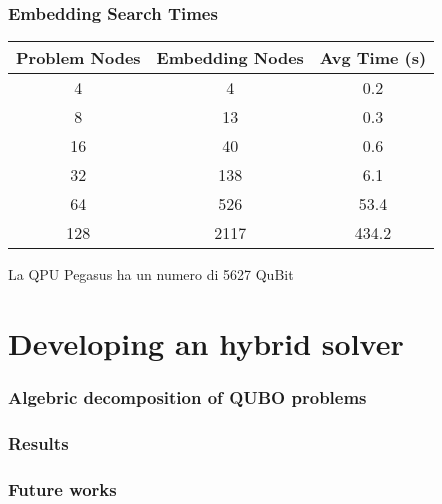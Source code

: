 \documentclass[aspectratio=169]{beamer}
\begin{document}
\begin{frame}
    \frametitle{Embedding Search Times}

    \begin{table}
        \centering
        \begin{tabular}{c|c|c}
            Problem Nodes & Embedding Nodes & Avg Time (s) \\ \hline
            4 & 4 & 0.2 \\
            8 & 13 & 0.3 \\
            16 & 40 & 0.6 \\
            32 & 138 & 6.1 \\
            64 & 526 & 53.4 \\
            128 & 2117 & 434.2 \\
        \end{tabular}
    \end{table}

    \begin{center}
        La QPU Pegasus ha un numero di 5627 QuBit
    \end{center}

\end{frame}

\section{Developing an hybrid solver}

\begin{frame}
    \frametitle{Algebric decomposition of QUBO problems}

    

\end{frame}

\begin{frame}
    \frametitle{Results}

    

\end{frame}

\begin{frame}
    \frametitle{Future works}

    

\end{frame}
\end{document}
